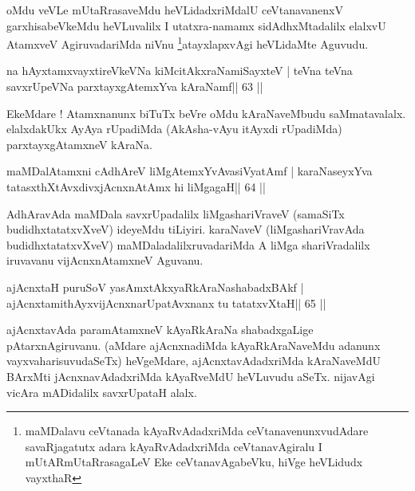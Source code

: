 \begin{artha}
oMdu veVLe mUtaRrasaveMdu heVLidadxriMdalU ceVtanavanenxV
garxhisabeVkeMdu heVLuvalilx I utatxra-namamx sidAdhxMtadalilx elalxvU
AtamxveV AgiruvadariMda niVnu \footnote{maMDalavu ceVtanada
kAyaRvAdadxriMda ceVtanavenunxvudAdare savaRjagatutx adara
kAyaRvAdadxriMda ceVtanavAgiralu I mUtARmUtaRrasagaLeV
Eke ceVtanavAgabeVku, hiVge heVLidudx vayxthaR}atayxlapxvAgi heVLidaMte
Aguvudu.
\end{artha}



\begin{shl}
na hAyxtamxvayxtireVkeVNa kiMcitAkxraNamiSayxteV |
teVna teVna savxrUpeVNa parxtayxgAtemxYva kAraNamf\hfill || 63 ||
\end{shl}

\begin{artha}
EkeMdare ! Atamxnanunx biTuTx beVre oMdu kAraNaveMbudu saMmatavalalx. elalxdakUkx AyAya rUpadiMda (AkAsha-vAyu itAyxdi rUpadiMda) parxtayxgAtamxneV kAraNa.
\end{artha}



\begin{shl}
maMDalAtamxni cA\s\s dhAreV liMgAtemxYvAvasiVyatAmf |
karaNaseyxYva tatasxthXtAvxdivxjAcnxnAtAmx hi liMgagaH\hfill || 64 ||
\end{shl}

\begin{artha}
AdhAravAda maMDala savxrUpadalilx liMgashariVraveV (samaSiTx
budidhxtatatxvXveV) ideyeMdu tiLiyiri. karaNaveV (liMgashariVravAda
budidhxtatatxvXveV) maMDaladalilxruvadariMda A liMga shariVradalilx
iruvavanu vijAcnxnAtamxneV Aguvanu.
\end{artha}



\begin{shl}
ajAcnxtaH puruSoV yasAmxtAkxyaRkAraNashabadxBAkf |
ajAcnxtamithAyxvijAcnxnarUpatAvxnanx tu tatatxvXtaH\hfill || 65 ||
\end{shl}

\begin{artha}
ajAcnxtavAda paramAtamxneV kAyaRkAraNa shabadxgaLige
pAtarxnAgiruvanu.  (aMdare ajAcnxnadiMda kAyaRkAraNaveMdu adanunx
vayxvaharisuvudaSeTx) heVgeMdare, ajAcnxtavAdadxriMda kAraNaveMdU BArxMti
jAcnxnavAdadxriMda kAyaRveMdU heVLuvudu aSeTx. nijavAgi vicAra
mADidalilx savxrUpataH alalx. 
\end{artha}



